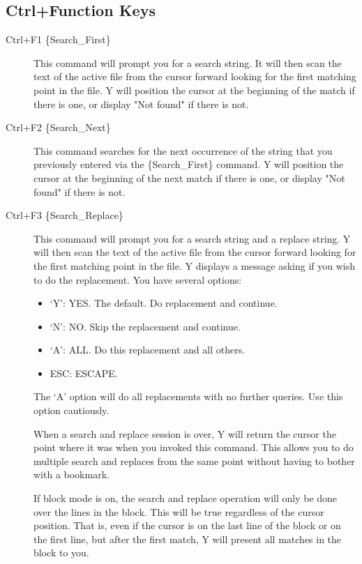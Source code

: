 \subsection{Ctrl+Function Keys}

\begin{description}

\item[Ctrl+F1 \{Search\_First\}] This command will prompt you for a search string. It will then
  scan the text of the active file from the cursor forward looking for the first matching point
  in the file. Y will position the cursor at the beginning of the match if there is one, or
  display "Not found" if there is not.


\item[Ctrl+F2 \{Search\_Next\}] This command searches for the next occurrence of the string
  that you previously entered via the \{Search\_First\} command. Y will position the cursor at
  the beginning of the next match if there is one, or display "Not found" if there is not.

\item[Ctrl+F3 \{Search\_Replace\}] This command will prompt you for a search string and a
  replace string. Y will then scan the text of the active file from the cursor forward looking
  for the first matching point in the file. Y displays a message asking if you wish to do the
  replacement. You have several options:

  \begin{itemize}
  \item `Y': YES. The default. Do replacement and continue.
  \item `N': NO. Skip the replacement and continue.
  \item `A': ALL. Do this replacement and all others.
  \item ESC: ESCAPE.
  \end{itemize}

  The `A' option will do all replacements with no further queries. Use this option cautiously.

  When a search and replace session is over, Y will return the cursor the point where it was
  when you invoked this command. This allows you to do multiple search and replaces from the
  same point without having to bother with a bookmark.

  If block mode is on, the search and replace operation will only be done over the lines in the
  block. This will be true regardless of the cursor position. That is, even if the cursor is on
  the last line of the block or on the first line, but after the first match, Y will present all
  matches in the block to you.


\end{description}
